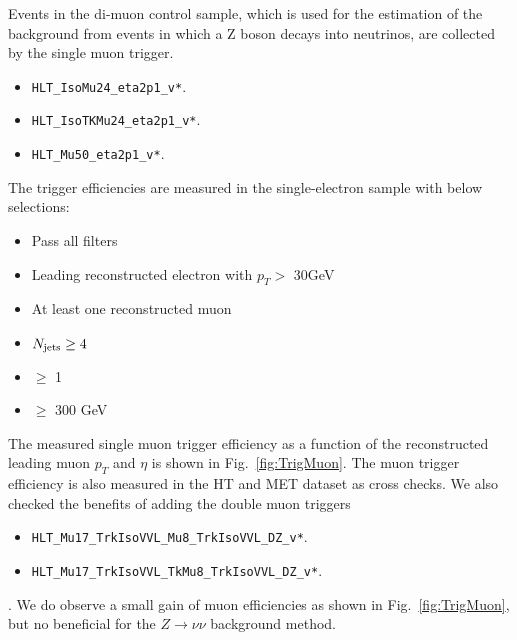 Events in the di-muon control sample, which is used for the estimation of the
background from events in which a Z boson decays into neutrinos, are
collected by the single muon trigger. 
\begin{itemize}
  \item \texttt{HLT\_IsoMu24\_eta2p1\_v*}.
  \item \texttt{HLT\_IsoTKMu24\_eta2p1\_v*}.
  \item \texttt{HLT\_Mu50\_eta2p1\_v*}.
\end{itemize}
The trigger efficiencies are measured in the single-electron sample with below selections:
\begin{itemize}
  \item Pass all filters
	\item Leading reconstructed electron with $p_{T}>$ 30GeV
  \item At least one reconstructed muon
  \item $N_{\text{jets}}\geq4$
  \item \nbjets $\ge$ 1
  \item \HT $\ge$ 300 GeV
\end{itemize}

The measured single muon trigger efficiency as a function of the reconstructed
leading muon $p_{T}$ and $\eta$ is shown in Fig.~\ref{fig:TrigMuon}.
The muon trigger efficiency is also measured in the HT and MET dataset as
cross checks. We also checked the benefits of adding the double muon triggers
\begin{itemize}
  \item \texttt{HLT\_Mu17\_TrkIsoVVL\_Mu8\_TrkIsoVVL\_DZ\_v*}.
  \item \texttt{HLT\_Mu17\_TrkIsoVVL\_TkMu8\_TrkIsoVVL\_DZ\_v*}.
\end{itemize}.
We do observe a small gain of muon efficiencies as shown in
Fig.~\ref{fig:TrigMuon}, but no beneficial for the $Z \rightarrow \nu \nu$ background method.

